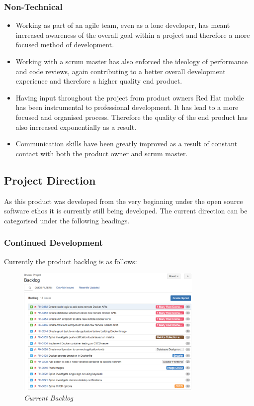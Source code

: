 \subsubsection{Non-Technical}
\begin{itemize}
	\item Working as part of an agile team, even as a lone developer, has meant increased awareness of the overall goal within a project and therefore a more focused method of development.
	\item Working with a scrum master has also enforced the ideology of performance and code reviews, again contributing to a better overall development experience and therefore a higher quality end product.
	\item Having input throughout the project from product owners Red Hat mobile has been instrumental to professional development. It has lead to a more focused and organised process. Therefore the quality of the end product has also increased exponentially as a result.
	\item Communication skills have been greatly improved as a result of constant contact with both the product owner and scrum master.
\end{itemize}

\newpage
\subsection{Project Direction}
As this product was developed from the very beginning under the open source software ethos it is currently still being developed. The current direction can be categorised under the following headings.

\subsubsection{Continued Development}
Currently the product backlog is as follows:

\begin{figure}[!ht]
	\centering
	\includegraphics*[width=0.8\textwidth]{images/final_backlog}
	\caption{\em Current Backlog}
	\label{fig:final_backlog}
\end{figure}

